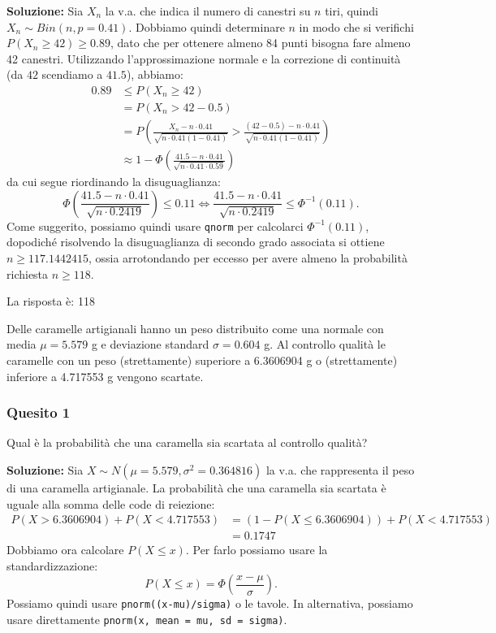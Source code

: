 \documentclass[12pt, a4paper]{article}
\begin{document}
\textbf{Soluzione:}
Sia $X_n$ la v.a. che indica il numero di canestri su $n$ tiri, quindi $X_n \sim Bin(n, p=0.41)$.
Dobbiamo quindi determinare $n$ in modo che si verifichi $P(X_n \geq 42) \geq 0.89$, dato che per ottenere almeno 84 punti bisogna fare almeno 42 canestri. Utilizzando l’approssimazione normale e la correzione di continuità (da $42$ scendiamo a $41.5$), abbiamo:
$$ \begin{aligned} 0.89 &\leq P(X_n \geq 42) \\ &= P(X_n > 42 - 0.5) \\ &= P\left(\frac{X_n - n \cdot 0.41}{\sqrt{n \cdot 0.41(1-0.41)}} > \frac{(42 - 0.5) - n \cdot 0.41}{\sqrt{n \cdot 0.41(1-0.41)}}\right) \\ &\approx 1 - \Phi\left(\frac{41.5 - n \cdot 0.41}{\sqrt{n \cdot 0.41 \cdot 0.59}}\right) \end{aligned} $$
da cui segue riordinando la disuguaglianza:
$$ \Phi\left(\frac{41.5 - n \cdot 0.41}{\sqrt{n \cdot 0.2419}}\right) \leq 0.11 \iff \frac{41.5 - n \cdot 0.41}{\sqrt{n \cdot 0.2419}} \leq \Phi^{-1}(0.11). $$
Come suggerito, possiamo quindi usare \texttt{qnorm} per calcolarci $\Phi^{-1}(0.11)$, dopodiché risolvendo la disuguaglianza di secondo grado associata si ottiene $n \geq 117.1442415$, ossia arrotondando per eccesso per avere almeno la probabilità richiesta $n \geq 118$.

La risposta è: 118


\vspace{0.5cm}
\begin{tcolorbox}[colback=lightergray!10, colframe=tocsec, title=\textbf{Esercizio 10}]
Delle caramelle artigianali hanno un peso distribuito come una normale con media $\mu=5.579$ g e deviazione standard $\sigma=0.604$ g. Al controllo qualità le caramelle con un peso (strettamente) superiore a 6.3606904 g o (strettamente) inferiore a 4.717553 g vengono scartate.
\end{tcolorbox}

\subsubsection*{Quesito 1}
Qual è la probabilità che una caramella sia scartata al controllo qualità?

\textbf{Soluzione:}
Sia $X \sim N(\mu=5.579, \sigma^2=0.364816)$ la v.a. che rappresenta il peso di una caramella artigianale.
La probabilità che una caramella sia scartata è uguale alla somma delle code di reiezione:
$$ \begin{aligned} P(X > 6.3606904) + P(X < 4.717553) &= (1 - P(X \leq 6.3606904)) + P(X < 4.717553) \\ &= 0.1747 \end{aligned} $$
Dobbiamo ora calcolare $P(X \leq x)$. Per farlo possiamo usare la standardizzazione:
$$ P(X \leq x) = \Phi\left(\frac{x - \mu}{\sigma}\right). $$
Possiamo quindi usare \texttt{pnorm((x-mu)/sigma)} o le tavole. In alternativa, possiamo usare direttamente \texttt{pnorm(x, mean = mu, sd = sigma)}.
\end{document}

